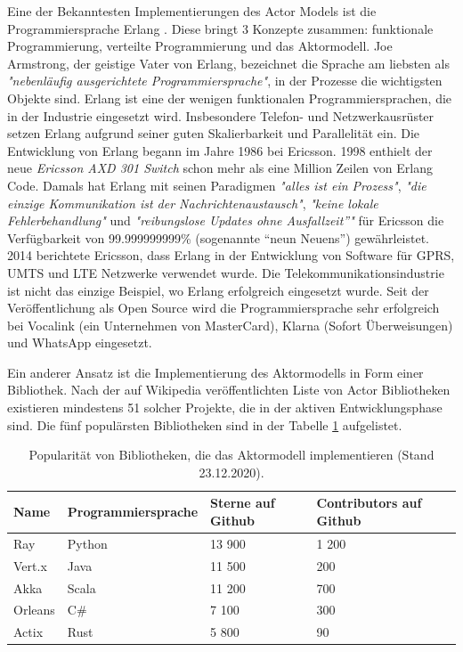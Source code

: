 Eine der Bekanntesten Implementierungen des Actor Models ist die Programmiersprache Erlang \cite{Armstrong93concurrentprogramming}. Diese bringt 3 Konzepte zusammen: funktionale Programmierung, verteilte Programmierung und das Aktormodell. Joe Armstrong, der geistige Vater von Erlang, bezeichnet die Sprache am liebsten als \textit{"nebenläufig ausgerichtete Programmiersprache"}, in der Prozesse die wichtigsten Objekte sind. Erlang ist eine der wenigen funktionalen Programmiersprachen, die in der Industrie eingesetzt wird. Insbesondere Telefon- und Netzwerkausrüster setzen Erlang aufgrund seiner guten Skalierbarkeit und Parallelität ein. Die Entwicklung von Erlang begann im Jahre 1986 bei Ericsson. 1998 enthielt der neue \textit{Ericsson AXD 301 Switch} schon mehr als eine Million Zeilen von Erlang Code. Damals hat Erlang mit seinen Paradigmen \textit{"alles ist ein Prozess"}, \textit{"die einzige Kommunikation ist der Nachrichtenaustausch"}, \textit{"keine lokale Fehlerbehandlung"} und \textit{"reibungslose Updates ohne Ausfallzeit”"} für Ericsson die Verfügbarkeit von 99.999999999\% (sogenannte “neun Neuens”) gewährleistet. 2014 berichtete Ericsson, dass Erlang in der Entwicklung von Software für GPRS, UMTS und LTE Netzwerke verwendet wurde. Die Telekommunikationsindustrie ist nicht das einzige Beispiel, wo Erlang erfolgreich eingesetzt wurde. Seit der Veröffentlichung als Open Source wird die Programmiersprache sehr erfolgreich bei Vocalink (ein Unternehmen von MasterCard), Klarna (Sofort Überweisungen) und WhatsApp eingesetzt.

Ein anderer Ansatz ist die Implementierung des Aktormodells in Form einer Bibliothek. Nach der auf Wikipedia veröffentlichten Liste von Actor Bibliotheken existieren mindestens 51 solcher Projekte, die in der aktiven Entwicklungsphase sind. Die fünf populärsten Bibliotheken sind in der Tabelle \ref{tab:vergleichBibliotheken} aufgelistet.

\begin{table} \centering
	\begin{tabular}{|p{1.5cm}|p{4cm}|p{4cm}|p{4cm}|} 
		\hline
		\textbf{Name} & \textbf{Programmiersprache} & \textbf{Sterne auf Github} & \textbf{Contributors auf Github}\\
		
		\hline
		Ray & Python & 13 900 & 1 200 \\
		
		\hline
		Vert.x & Java & 11 500 & 200 \\
		
		\hline
		Akka & Scala & 11 200 & 700 \\
		
		\hline
		Orleans & C\# & 7 100 & 300 \\
		
		\hline
		Actix & Rust & 5 800 & 90 \\

		\hline
	\end{tabular}
	\caption{Popularität von Bibliotheken, die das Aktormodell implementieren (Stand 23.12.2020).}
	\label{tab:vergleichBibliotheken}
\end{table}

